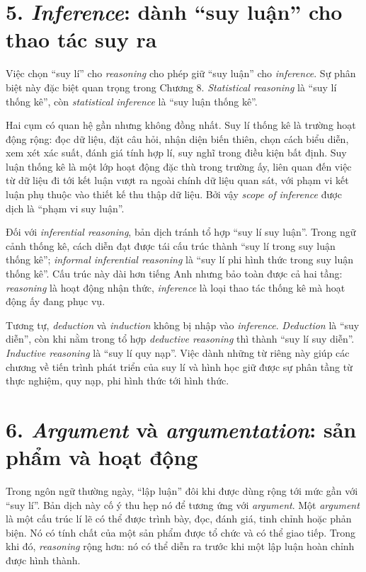 \section*{5. \emph{Inference}: dành ``suy luận'' cho thao tác suy ra}

Việc chọn ``suy lí'' cho \emph{reasoning} cho phép giữ ``suy luận'' cho \emph{inference}. Sự phân biệt này đặc biệt quan trọng trong Chương 8. \emph{Statistical reasoning} là ``suy lí thống kê'', còn \emph{statistical inference} là ``suy luận thống kê''.

Hai cụm có quan hệ gần nhưng không đồng nhất. Suy lí thống kê là trường hoạt động rộng: đọc dữ liệu, đặt câu hỏi, nhận diện biến thiên, chọn cách biểu diễn, xem xét xác suất, đánh giá tính hợp lí, suy nghĩ trong điều kiện bất định. Suy luận thống kê là một lớp hoạt động đặc thù trong trường ấy, liên quan đến việc từ dữ liệu đi tới kết luận vượt ra ngoài chính dữ liệu quan sát, với phạm vi kết luận phụ thuộc vào thiết kế thu thập dữ liệu. Bởi vậy \emph{scope of inference} được dịch là ``phạm vi suy luận''.

Đối với \emph{inferential reasoning}, bản dịch tránh tổ hợp ``suy lí suy luận''. Trong ngữ cảnh thống kê, cách diễn đạt được tái cấu trúc thành ``suy lí trong suy luận thống kê''; \emph{informal inferential reasoning} là ``suy lí phi hình thức trong suy luận thống kê''. Cấu trúc này dài hơn tiếng Anh nhưng bảo toàn được cả hai tầng: \emph{reasoning} là hoạt động nhận thức, \emph{inference} là loại thao tác thống kê mà hoạt động ấy đang phục vụ.

Tương tự, \emph{deduction} và \emph{induction} không bị nhập vào \emph{inference}. \emph{Deduction} là ``suy diễn'', còn khi nằm trong tổ hợp \emph{deductive reasoning} thì thành ``suy lí suy diễn''. \emph{Inductive reasoning} là ``suy lí quy nạp''. Việc dành những từ riêng này giúp các chương về tiến trình phát triển của suy lí và hình học giữ được sự phân tầng từ thực nghiệm, quy nạp, phi hình thức tới hình thức.

\section*{6. \emph{Argument} và \emph{argumentation}: sản phẩm và hoạt động}

Trong ngôn ngữ thường ngày, ``lập luận'' đôi khi được dùng rộng tới mức gần với ``suy lí''. Bản dịch này cố ý thu hẹp nó để tương ứng với \emph{argument}. Một \emph{argument} là một cấu trúc lí lẽ có thể được trình bày, đọc, đánh giá, tinh chỉnh hoặc phản biện. Nó có tính chất của một sản phẩm được tổ chức và có thể giao tiếp. Trong khi đó, \emph{reasoning} rộng hơn: nó có thể diễn ra trước khi một lập luận hoàn chỉnh được hình thành.

